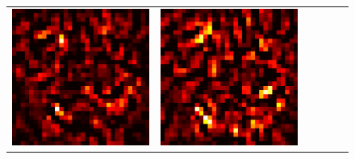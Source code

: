 \documentclass[preprint,12pt]{elsarticle}
\begin{document}
\begin{figure}[p]
\begin{tabular}{cccccc}
  \includegraphics[scale=\scale]{../visualizations/examples/cifar10/resnet18/positive_saliency_map/1.png} & 
  \includegraphics[scale=\scale]{../visualizations/examples/cifar10/resnet18/negative_saliency_map/1.png} & 

\end{tabular}
\end{figure}
\end{document}
